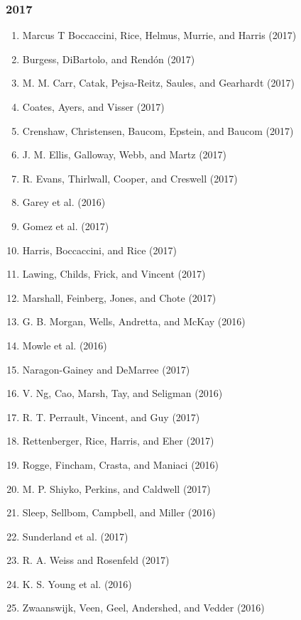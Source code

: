 \documentclass[english,man]{apa6}
\providecommand{\tightlist}{%
  \setlength{\itemsep}{0pt}\setlength{\parskip}{0pt}}
\theoremstyle{definition}
\theoremstyle{definition}
\theoremstyle{definition}
\theoremstyle{remark}
\begin{document}
\subsubsection{2017}\label{section-41}

\begin{enumerate}
\def\labelenumi{\arabic{enumi})}
\tightlist
\item
  Marcus T Boccaccini, Rice, Helmus, Murrie, and Harris (2017)
\item
  Burgess, DiBartolo, and Rendón (2017)
\item
  M. M. Carr, Catak, Pejsa-Reitz, Saules, and Gearhardt (2017)
\item
  Coates, Ayers, and Visser (2017)
\item
  Crenshaw, Christensen, Baucom, Epstein, and Baucom (2017)
\item
  J. M. Ellis, Galloway, Webb, and Martz (2017)
\item
  R. Evans, Thirlwall, Cooper, and Creswell (2017)
\item
  Garey et al. (2016)
\item
  Gomez et al. (2017)
\item
  Harris, Boccaccini, and Rice (2017)
\item
  Lawing, Childs, Frick, and Vincent (2017)
\item
  Marshall, Feinberg, Jones, and Chote (2017)
\item
  G. B. Morgan, Wells, Andretta, and McKay (2016)
\item
  Mowle et al. (2016)
\item
  Naragon-Gainey and DeMarree (2017)
\item
  V. Ng, Cao, Marsh, Tay, and Seligman (2016)
\item
  R. T. Perrault, Vincent, and Guy (2017)
\item
  Rettenberger, Rice, Harris, and Eher (2017)
\item
  Rogge, Fincham, Crasta, and Maniaci (2016)
\item
  M. P. Shiyko, Perkins, and Caldwell (2017)
\item
  Sleep, Sellbom, Campbell, and Miller (2016)
\item
  Sunderland et al. (2017)
\item
  R. A. Weiss and Rosenfeld (2017)
\item
  K. S. Young et al. (2016)
\item
  Zwaanswijk, Veen, Geel, Andershed, and Vedder (2016)
\end{enumerate}
\end{document}
